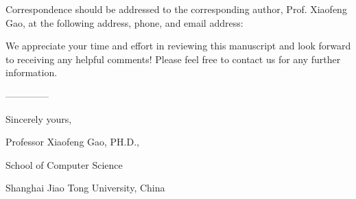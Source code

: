 \documentclass[11pt, a4paper]{article}
\begin{document}



Correspondence should be addressed to the corresponding author, Prof. Xiaofeng Gao, at the following address, phone, and email address:
\vspace{2mm}

\vspace{2mm}

We appreciate your time and effort in reviewing this manuscript and look forward to receiving any helpful comments! Please feel free to contact us for any further information.

\noindent --------------

\noindent Sincerely yours,

\noindent Professor Xiaofeng Gao, PH.D.,

\noindent School of Computer Science

\noindent Shanghai Jiao Tong University, China
\end{document}
